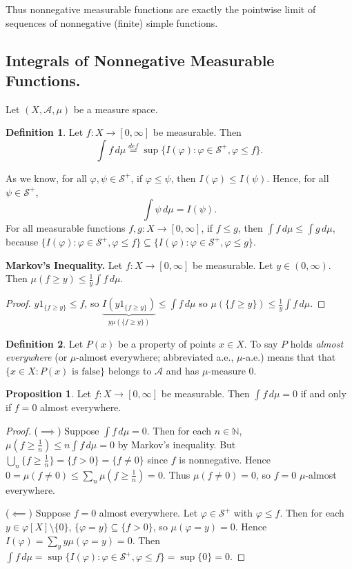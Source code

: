 \documentclass{article}
\newcommand{\N}{\mathbb{N}}
\theoremstyle{definition}
\newtheorem{proposition}[theorem]{Proposition}
\newtheorem*{definition}{Definition}
\begin{document}
Thus nonnegative measurable functions are exactly the pointwise limit of sequences of nonnegative (finite) simple functions.

\subsection*{Integrals of Nonnegative Measurable Functions.}

Let $(X,\mathscr{A},\mu)$ be a measure space.
\begin{definition}
    Let $f :X \longrightarrow [0, \infty]$ be measurable. Then
    \[
        \int f \,d\mu \stackrel{def}= \sup\{I(\varphi) : \varphi \in \mathscr{S}^+, \varphi \leq f\}.
    \]
\end{definition}

As we know, for all $\varphi, \psi \in \mathscr{S}^+$, if $\varphi \leq \psi$, then $I(\varphi) \leq I(\psi)$. Hence, for all $\psi \in \mathscr{S}^+$,
\[
    \int \psi \,d\mu = I(\psi).
\]
For all measurable functions $f, g : X \longrightarrow [0, \infty]$, if $f \leq g$, then $\int f \,d\mu \leq \int g\,d\mu$, because $\{I(\varphi) : \varphi \in \mathscr{S}^+, \varphi \leq f\} \subseteq \{I(\varphi) : \varphi \in \mathscr{S}^+, \varphi \leq g\}$.

\textbf{Markov's Inequality.}
Let $f : X \longrightarrow [0, \infty]$ be measurable. Let $y \in (0, \infty)$. Then $\mu(f \geq y) \leq \frac{1}{y}\int f\,d\mu$.
\begin{proof}
    $y 1_{\{f \geq y\}} \leq f$, so $\underbrace{I(y 1_{\{f \geq y\}})}_{y\mu(\{f \geq y\})} \leq \int f\,d\mu$ so $\mu(\{f \geq y\}) \leq \frac{1}{y}\int f\,d\mu$.
\end{proof}

\begin{definition}
    Let $P(x)$ be a property of points $x \in X$. To say $P$ holds \emph{almost everywhere} (or $\mu$-almost everywhere; abbreviated a.e., $\mu$-a.e.) means that that $\{x \in X : P(x) \text{ is false}\}$ belongs to $\mathscr{A}$ and has $\mu$-measure 0.
\end{definition}

\begin{proposition}
Let $f: X \longrightarrow [0, \infty]$ be measurable. Then $\int f\,d\mu = 0$ if and only if $f = 0$ almost everywhere.
\end{proposition}
\begin{proof}
    ($\implies$) Suppose $\int f\,d\mu = 0$. Then for each $n \in \N$, $\mu(f \geq \frac{1}{n}) \leq n\int f\,d\mu = 0$ by Markov's inequality. But $\bigcup_n \{f \geq \frac{1}{n}\} = \{f > 0\} = \{f \neq 0\}$ since $f$ is nonnegative. Hence $0 = \mu(f \neq 0) \leq \sum_{n} \mu(f \geq \frac{1}{n}) = 0$. Thus $\mu(f \neq 0) = 0$, so $f = 0$ $\mu$-almost everywhere.
    
    ($\impliedby$) Suppose $f = 0$ almost everywhere. Let $\varphi \in \mathscr{S}^+$ with $\varphi \leq f$. Then for each $y \in \varphi[X] \setminus \{0\}$, $\{\varphi = y\} \subseteq\{f > 0\}$, so $\mu(\varphi = y) = 0$. Hence $I(\varphi) = \sum_y y\mu(\varphi = y) = 0$. Then $\int f\,d\mu = \sup\{I(\varphi) : \varphi \in \mathscr{S}^+, \varphi \leq f\} = \sup\{0\} = 0$.
\end{proof}
\end{document}
